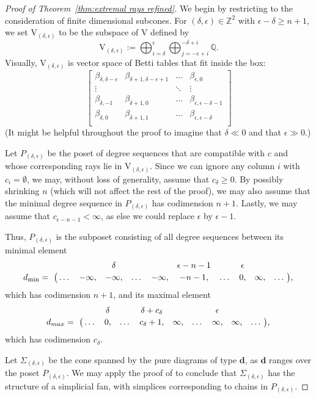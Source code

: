 \documentclass[12pt]{amsart}
\theoremstyle{definition}
\theoremstyle{remark}
\newcommand{\ZZ}{\mathbb{Z}}
\newcommand{\QQ}{\mathbb{Q}}
\newcommand{\VV}{\mathrm{V}}
\newcommand{\cc}{c}
\newcommand{\dd}{\mathbf{d}}
\newcommand{\nothing}{\emptyset}
\begin{document}
\begin{proof}[Proof of Theorem~\ref{thm:extremal rays refined}]
We begin by restricting to the consideration of finite dimensional subcones.  For $(\delta,\epsilon)\in \ZZ^2$ with $\epsilon-\delta\geq n+1$, we set $\VV_{(\delta,\epsilon)}$ to be the subspace of $\VV$ defined by
\[
\VV_{(\delta,\epsilon)}:=\bigoplus_{i=\delta}^\epsilon \bigoplus_{j=-\epsilon +i}^{-\delta+i} \QQ.
\]
Visually, $\VV_{(\delta,\epsilon)}$ is vector space of Betti tables that fit inside the box:
\[
\begin{bmatrix}
\beta_{\delta,\delta-\epsilon}&\beta_{\delta+1,\delta-\epsilon+1}&\dots&\beta_{\epsilon,0}\\
\vdots & &\ddots & \vdots\\
\beta_{\delta,-1}&\beta_{\delta+1,0}&\dots&\beta_{\epsilon,\epsilon-\delta-1}\\
\beta_{\delta,0}&\beta_{\delta+1,1}&\dots&\beta_{\epsilon,\epsilon-\delta}\\
\end{bmatrix}
\]
(It might be helpful throughout the proof to imagine that $\delta\ll 0$ and that $\epsilon\gg 0$.)


Let $P_{(\delta,\epsilon)}$ be the poset of degree sequences that are compatible with $\cc$ and whose corresponding rays lie in $\VV_{(\delta,\epsilon)}$.
Since we can ignore any column $i$ with $c_i=\nothing$, we may, without loss of generality, assume that $c_\delta \geq 0$.  By possibly shrinking $n$ (which will not affect the rest of the proof), we may also assume that the minimal degree sequence in $P_{(\delta,\epsilon)}$ has codimension $n+1$.  Lastly, we may assume that $c_{\epsilon-n-1}<\infty$, as else we could replace $\epsilon$ by $\epsilon-1$.

Thus, $P_{(\delta,\epsilon)}$ is the subposet consisting of all degree sequences between its minimal element 
\[\bordermatrix{&&&\delta&&&\epsilon-n-1&&\epsilon &&\cr
              d_{\min}= &\dots&-\infty,&-\infty,&\dots&-\infty,&-n-1,&\dots &0, &\infty,&\dots\cr},
              \]
              which has codimension $n+1$, and its maximal element
\[\bordermatrix{&&\delta&&\delta+c_\delta&&&\epsilon &&\cr
              d_{max}= &\dots&0,&\dots&c_{\delta}+1,&\infty,&\dots &\infty,&\infty,&\dots\cr},\]
              which has codimension $c_{\delta}$.


Let $\Sigma_{(\delta,\epsilon)}$ be the cone spanned by the pure diagrams of type $\dd$, as $\dd$ ranges over the poset $P_{(\delta,\epsilon)}$.  We may apply the proof of  \cite[Proposition~2.9]{boij-sod1} to conclude that $\Sigma_{(\delta,\epsilon)}$ has the structure of a simplicial fan, with simplices corresponding to chains in $P_{(\delta,\epsilon)}$.


\end{proof}
\end{document}
